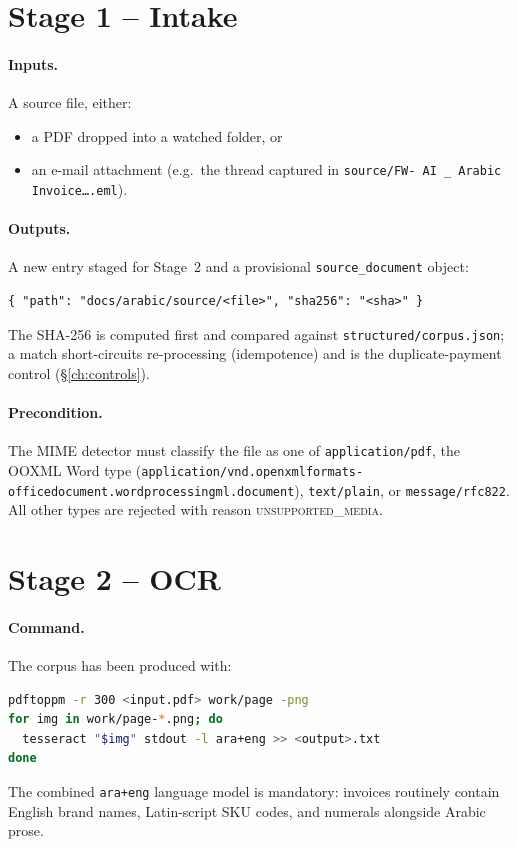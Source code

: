\documentclass[11pt,a4paper,twoside]{report}
\newcommand{\corpus}{}
\begin{document}
\section{Stage 1 -- Intake}

\paragraph{Inputs.} A source file, either:
\begin{itemize}
  \item a PDF dropped into a watched folder, or
  \item an e-mail attachment (e.g.\ the thread captured in
        \corpus\texttt{source/FW- AI~\_ Arabic Invoice\ldots.eml}).
\end{itemize}

\paragraph{Outputs.} A new entry staged for Stage~2 and a provisional
\texttt{source\_document} object:
\begin{lstlisting}[language=jsonx]
{ "path": "docs/arabic/source/<file>", "sha256": "<sha>" }
\end{lstlisting}
The SHA-256 is computed first and compared against
\corpus\texttt{structured/corpus.json}; a match short-circuits
re-processing (idempotence) and is the duplicate-payment control
(\S\ref{ch:controls}).

\paragraph{Precondition.} The MIME detector must classify the file as
one of \texttt{application/pdf}, the OOXML Word type
(\texttt{application/vnd.openxmlformats-\allowbreak officedocument.\allowbreak wordprocessingml.\allowbreak document}),
\texttt{text/plain}, or \texttt{message/rfc822}. All other types are
rejected with reason \textsc{unsupported\_media}.

\section{Stage 2 -- OCR}

\paragraph{Command.} The corpus has been produced with:
\begin{lstlisting}[language=bash,basicstyle=\ttfamily\small]
pdftoppm -r 300 <input.pdf> work/page -png
for img in work/page-*.png; do
  tesseract "$img" stdout -l ara+eng >> <output>.txt
done
\end{lstlisting}
The combined \texttt{ara+eng} language model is mandatory: invoices
routinely contain English brand names, Latin-script SKU codes, and
numerals alongside Arabic prose.
\end{document}
